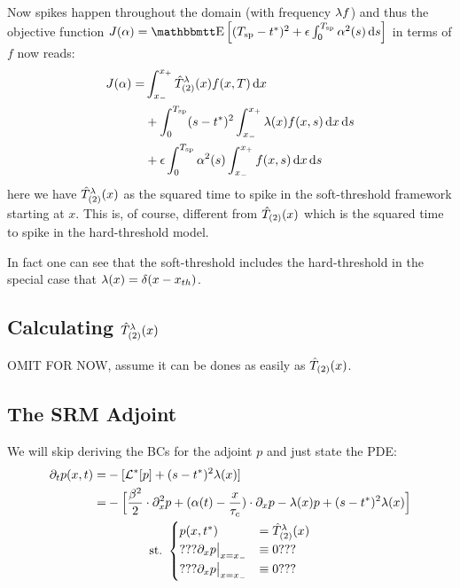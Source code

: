\documentclass{article}
\begin{document}
Now spikes happen throughout the domain (with frequency ${\lambda} f$) and thus the
objective function $
J(\a) = \Exp\left[
(\ts - \T)^2 + \e \int_0^\ts  \a^2(s) \intd{s}
\right]
$ in terms of $f$ now reads:
\begin{align}
J({\alpha}) = &
\int_{ x_{-} }^{ x_{+} } { \hat{T}^{\lambda}_{(2)} }(x) f(x,T) \, \mathrm{d} x
\\
&+ \int_0^{ T_{\textrm{sp} } } (s-{ t^* })^2  \int_{ x_{-} }^{ x_{+} } {\lambda}(x) f(x,s) \, \mathrm{d} x\, \mathrm{d} s
\notag
\\
&+  {\epsilon} \int_0^{ T_{\textrm{sp} } }  {\alpha}^2(s)  \int_{ x_{-} }^{ x_{+} } f(x,s) \, \mathrm{d} x \, \mathrm{d} s
\notag
\label{eq:OC_LS_variance_density_SRM}
\end{align}
here we have ${ \hat{T}^{\lambda}_{(2)} }(x)$ as the squared time to spike in the soft-threshold
framework starting at $x$. This is, of course, different from ${ \hat{T}_{(2)} }(x)$
which is the squared time to spike in the hard-threshold model.

In fact one can see that the soft-threshold includes the hard-threshold in the
special case that ${\lambda}(x) = \delta (x-{ x_{th} })$.

\subsection{Calculating  ${ \hat{T}^{\lambda}_{(2)} }(x)$}
OMIT FOR NOW, assume it can be dones as easily as ${ \hat{T}_{(2)} }(x)$.

\subsection{The SRM Adjoint}
We will skip deriving the BCs for the adjoint $p$ and just state the PDE:
\begin{equation}
\begin{gathered}
\begin{aligned}
{\partial}_t p(x,t) =& - [ { { \mathcal{L} }^* }[p] + (s-{ t^* })^2 {\lambda}(x) ]   
\\
		=&  
			-\Big[ \frac{{\beta}^2 }{2}\cdot {\partial}^2_x p +  
				({\alpha}(t)- \frac{x}{{ \tau_{c} }})  \cdot {\partial}_x p 
				- {\lambda}(x) p
				+ (s-{ t^* })^2 {\lambda}(x) 
			\Big] 
\end{aligned}
\\
{ \textrm{st.\ } }  
\begin{cases}
	p(x,{ t^* }) &= { \hat{T}^{\lambda}_{(2)} }(x)
	\\ 
	??? {\partial}_x p  \big|_{x={ x_{-} }} &\equiv 0 ???
	\\
	??? {\partial}_x p  \big|_{x={ x_{-} }} &\equiv 0 ???
\end{cases}
\label{eq:adjoint_pde_OU_SRM}
\end{gathered}
\end{equation} 
\end{document}
